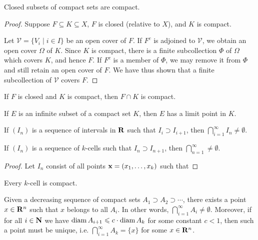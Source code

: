 \begin{proposition}
Closed subsets of compact sets are compact.
\end{proposition}

\begin{proof}
Suppose $F\subseteq K\subseteq X$, $F$ is closed (relative to $X$), and $K$ is compact.

Let $\mathcal{V}=\{V_i\mid i\in I\}$ be an open cover of $F$. If $F^c$ is adjoined to $\mathcal{V}$, we obtain an open cover $\Omega$ of $K$. Since $K$ is compact, there is a finite subcollection $\Phi$ of $\Omega$ which covers $K$, and hence $F$. If $F^c$ is a member of $\Phi$, we may remove it from $\Phi$ and still retain an open cover of $F$. We have thus shown that a finite subcollection of $\mathcal{V}$ covers $F$.
\end{proof}

\begin{corollary}
If $F$ is closed and $K$ is compact, then $F\cap K$ is compact.
\end{corollary}

\begin{proposition}
If $E$ is an infinite subset of a compact set $K$, then $E$ has a limit point in $K$.
\end{proposition}

\begin{proposition}
If $(I_n)$ is a sequence of intervals in $\mathbf R$ such that $I_i\supset I_{i+1}$, then $\bigcap_{i=1}^{\infty}I_n\neq\emptyset$.
\end{proposition}

\begin{proposition}
If $(I_n)$ is a sequence of $k$-cells such that $I_n\supset I_{n+1}$, then $\bigcap_{n=1}^{\infty}\neq\emptyset$.
\end{proposition}

\begin{proof}
Let $I_n$ consist of all points $\vb{x}=(x_1,\dots,x_k)$ such that
\end{proof}

\begin{proposition}
Every $k$-cell is compact.
\end{proposition}

\begin{theorem}
Given a decreasing sequence of compact sets $A_1\supset A_2 \supset \cdots$, there exists a point $x\in\mathbf R^n$ such that $x$ belongs to all $A_i$. In other words, $\bigcap_{i=1}^\infty A_i\neq\emptyset$. Moreover, if for all $i\in\mathbf N$ we have $\operatorname{diam} A_{i+1}\leqslant c\cdot\operatorname{diam} A_k$ for some constant $c<1$, then such a point must be unique, i.e. $\bigcap_{i=1}^\infty A_k=\{x\}$ for some $x\in\mathbf R^n$.
\end{theorem}

